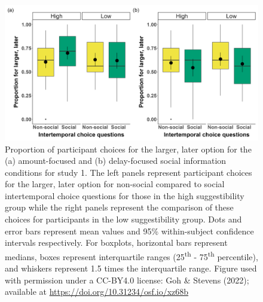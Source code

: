 \documentclass[
  doc,floatsintext]{apa6}
\begin{document}
\begin{figure}

{\centering \includegraphics[width=1\linewidth]{figures/suggestibility_itc_1} 

}

\caption{Proportion of participant choices for the larger, later option for the (a) amount-focused and (b) delay-focused social information conditions for study 1. The left panels represent participant choices for the larger, later option for non-social compared to social intertemporal choice questions for those in the high suggestibility group while the right panels represent the comparison of these choices for participants in the low suggestibility group. Dots and error bars represent mean values and 95\% within-subject confidence intervals respectively. For boxplots, horizontal bars represent medians, boxes represent interquartile ranges (25\textsuperscript{th} - 75\textsuperscript{th} percentile), and whiskers represent 1.5 times the interquartile range. Figure used with permission under a CC-BY4.0 license: Goh \& Stevens (2022); available at \url{https://doi.org/10.31234/osf.io/xz68b}}\label{fig:suggestibility1}
\end{figure}
\end{document}

